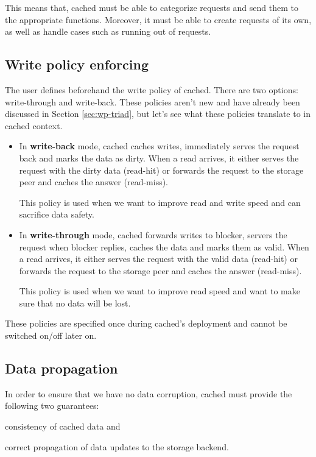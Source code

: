 This means that, cached must be able to categorize requests and send them to 
the appropriate functions. Moreover, it must be able to create requests of its 
own, as well as handle cases such as running out of requests.

\subsection{Write policy enforcing}\label{sec:cached-wcp-design}

The user defines beforehand the write policy of cached. There are two options: 
write-through and write-back. These policies aren't new and have already been 
discussed in Section \ref{sec:wp-triad}, but let's see what these policies 
translate to in cached context.

\begin{itemize}
	\item
		In \textbf{write-back} mode, cached caches writes, immediately 
		serves the request back and marks the data as dirty. When a read 
		arrives, it either serves the request with the dirty data 
		(read-hit) or forwards the request to the storage peer and 
		caches the answer (read-miss).

		This policy is used when we want to improve read and write speed 
		and can sacrifice data safety.
	\item
		In \textbf{write-through} mode, cached forwards writes to 
		blocker, servers the request when blocker replies, caches the 
		data and marks them as valid.  When a read arrives, it either 
		serves the request with the valid data (read-hit) or forwards 
		the request to the storage peer and caches the answer 
		(read-miss).

		This policy is used when we want to improve read speed and want 
		to make sure that no data will be lost.
\end{itemize}	

These policies are specified once during cached's deployment and cannot be 
switched on/off later on.

\subsection{Data propagation}

In order to ensure that we have no data corruption, cached must provide the 
following two guarantees:
\begin{inparaenum}[i)]
\item consistency of cached data and
\item correct propagation of data updates to the storage backend.
\end{inparaenum}

